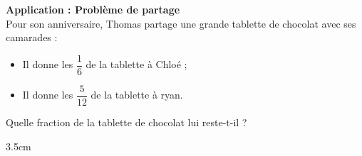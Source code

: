 \documentclass[a4paper]{book}
\begin{document}
    \begin{exemple}
        \textbf{Application : Problème de partage} \\[0.1cm]
        Pour son anniversaire, Thomas partage une grande tablette de chocolat avec ses camarades :
        \begin{itemize}
            \item Il donne les $\dfrac{1}{6}$ de la tablette à Chloé ;
            \item Il donne les $\dfrac{5}{12}$ de la tablette à ryan.
        \end{itemize}
        Quelle fraction de la tablette de chocolat lui reste-t-il ?
        \begin{ZoneReponse}{3.5cm}
        \end{ZoneReponse}
    \end{exemple}
    
\end{document}
